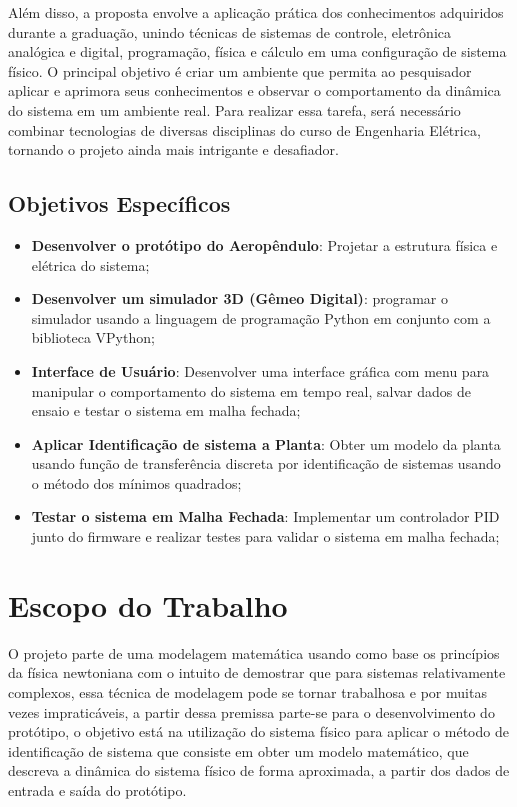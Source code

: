 Além disso, a proposta envolve a aplicação prática dos conhecimentos adquiridos durante a graduação, unindo técnicas de sistemas de controle, eletrônica analógica e digital, programação, física e cálculo em uma configuração de sistema físico. O principal objetivo é criar um ambiente que permita ao pesquisador aplicar e aprimora seus conhecimentos e observar o comportamento da dinâmica do sistema em um ambiente real. Para realizar essa tarefa, será necessário combinar tecnologias de diversas disciplinas do curso de Engenharia Elétrica, tornando o projeto ainda mais intrigante e desafiador.


\subsection{Objetivos Específicos}

\begin{itemize}
        \setlength{\itemsep}{-2pt}
	\item \textbf{Desenvolver o protótipo do Aeropêndulo}: Projetar a estrutura física e elétrica do sistema;
        \item \textbf{Desenvolver um simulador 3D (Gêmeo Digital)}: programar o simulador usando a linguagem de programação Python em conjunto com a biblioteca VPython;
        \item \textbf{Interface de Usuário}: Desenvolver uma interface gráfica com menu para manipular o comportamento do sistema em tempo real, salvar dados de ensaio e testar o sistema em malha fechada;
        \item \textbf{Aplicar Identificação de sistema a Planta}: Obter um modelo da planta usando função de transferência discreta  por identificação de sistemas usando o método dos mínimos quadrados;
        \item \textbf{Testar o sistema  em Malha Fechada}: Implementar um controlador PID junto do firmware e realizar testes para validar o sistema em malha fechada;
\end{itemize}


\section{Escopo do Trabalho}

O projeto parte de uma modelagem matemática usando como base os princípios da física newtoniana com o intuito de demostrar que para sistemas relativamente complexos, essa técnica de modelagem pode se tornar trabalhosa e por muitas vezes impraticáveis, a partir dessa premissa parte-se para o desenvolvimento do protótipo, o objetivo está na utilização do sistema físico para aplicar o método de identificação de sistema que consiste em obter um modelo matemático, que descreva a dinâmica do sistema físico de forma aproximada, a partir dos dados de entrada e saída do protótipo.

